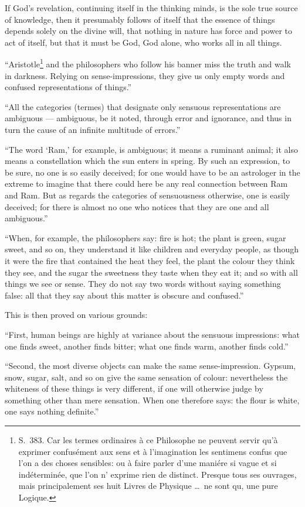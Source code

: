 \documentclass[12pt,a4paper]{article}
\begin{document}
If God's revelation, continuing itself in the thinking minds, is the sole true
source of knowledge, then it presumably follows of itself that the essence of
things depends solely on the divine will, that nothing in nature has force and
power to act of itself, but that it must be God, God alone, who works all in all
things.

``Aristotle\footnote{S.~383. Car les termes ordinaires à ce Philosophe ne peuvent
servir qu'à exprimer confusément aux sens et à l'imagination les sentimens confus
que l'on a des choses sensibles: ou à faire parler d'une maniére si vague et si
indéterminée, que l'on n' exprime rien de distinct. Presque tous ses ouvrages,
mais principalement ses huit Livres de Physique \dots\ ne sont qu, une pure
Logique.} and the philosophers who follow his banner miss the truth and walk in
darkness. Relying on sense-impressions, they give us only empty words and confused
representations of things.''

``All the categories (termes) that designate only sensuous representations are
ambiguous --- ambiguous, be it noted, through error and ignorance, and thus in
turn the cause of an infinite multitude of errors.''

``The word `Ram,' for example, is ambiguous; it means a ruminant animal; it also
means a constellation which the sun enters in spring. By such an expression, to be
sure, no one is so easily deceived; for one would have to be an astrologer in the
extreme to imagine that there could here be any real connection between Ram and
Ram. But as regards the categories of sensuousness otherwise, one is easily
deceived; for there is almost no one who notices that they are one and all
ambiguous.''

``When, for example, the philosophers say: fire is hot; the plant is green, sugar
sweet, and so on, they understand it like children and everyday people, as though
it were the fire that contained the heat they feel, the plant the colour they
think they see, and the sugar the sweetness they taste when they eat it; and
so with all things we see or sense. They do not say two words without saying
something false: all that they say about this matter is obscure and confused.''

This is then proved on various grounds:

``First, human beings are highly at variance about the sensuous impressions: what
one finds sweet, another finds bitter; what one finds warm, another finds cold.''

``Second, the most diverse objects can make the same sense-impression. Gypsum,
snow, sugar, salt, and so on give the same sensation of colour: nevertheless the
whiteness of these things is very different, if one will otherwise judge by
something other than mere sensation. When one therefore says: the flour is white,
one says nothing definite.''
\end{document}
